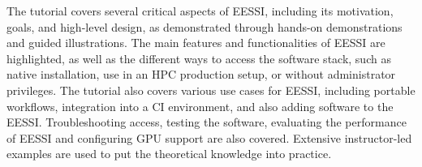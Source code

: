 

The tutorial covers several critical aspects of EESSI, including its motivation, goals, and high-level design, as demonstrated through hands-on demonstrations and guided illustrations. The main features and functionalities of EESSI are highlighted, as well as the different ways to access the software stack, such as native installation, use in an HPC production setup, or without administrator privileges. The tutorial also covers various use cases for EESSI, including portable workflows, integration into a CI environment, and also adding software to the EESSI. Troubleshooting access, testing the software, evaluating the performance of EESSI and configuring GPU support are also covered. Extensive instructor-led examples are used to put the theoretical knowledge into practice.

